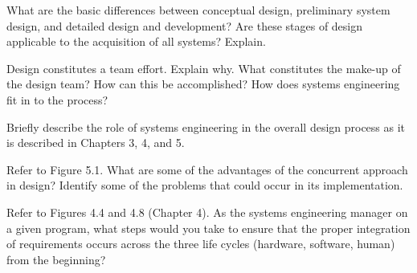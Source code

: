 \begin{exercises}
    \begin{exercise}
    \label{sea-5-1}
        What are the basic differences between conceptual design, preliminary system design, and detailed design and development? Are these stages of design applicable to the acquisition of all systems? Explain.
    \end{exercise}
    \begin{solution}
    \end{solution}
    
    \begin{exercise}
    \label{sea-5-2}
        Design constitutes a team effort. Explain why. What constitutes the make-up of the design team? How can this be accomplished? How does systems engineering fit in to the process?
    \end{exercise}
    \begin{solution}
    \end{solution}
    
    \begin{exercise}
    \label{sea-5-3}
        Briefly describe the role of systems engineering in the overall design process as it is described in Chapters 3, 4, and 5.
    \end{exercise}
    \begin{solution}
    \end{solution}
    
    \begin{exercise}
    \label{sea-5-4}
        Refer to Figure 5.1. What are some of the advantages of the concurrent approach in design? Identify some of the problems that could occur in its implementation.
    \end{exercise}
    \begin{solution}
    \end{solution}
    
    \begin{exercise}
    \label{sea-5-5}
        Refer to Figures 4.4 and 4.8 (Chapter 4). As the systems engineering manager on a given program, what steps would you take to ensure that the proper integration of requirements occurs across the three life cycles (hardware, software, human) from the beginning?
    \end{exercise}
    \begin{solution}
    \end{solution}
    

\end{exercises}
